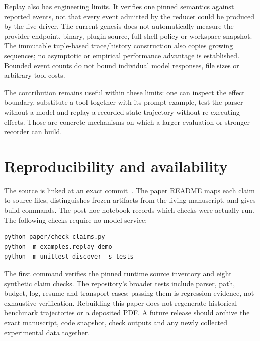 \documentclass[10pt,twocolumn,letterpaper]{article}
\begin{document}
Replay also has engineering limits. It verifies one pinned semantics against reported events, not that every event admitted by the reducer could be produced by the live driver. The current genesis does not automatically measure the provider endpoint, binary, plugin source, full shell policy or workspace snapshot. The immutable tuple-based trace/history construction also copies growing sequences; no asymptotic or empirical performance advantage is established. Bounded event counts do not bound individual model responses, file sizes or arbitrary tool costs.

The contribution remains useful within these limits: one can inspect the effect boundary, substitute a tool together with its prompt example, test the parser without a model and replay a recorded state trajectory without re-executing effects. Those are concrete mechanisms on which a larger evaluation or stronger recorder can build.

\section{Reproducibility and availability}
The source is linked at an exact commit~\cite{nakedagentsource}. The paper README maps each claim to source files, distinguishes frozen artifacts from the living manuscript, and gives build commands. The post-hoc notebook records which checks were actually run. The following checks require no model service:
\begin{lstlisting}
python paper/check_claims.py
python -m examples.replay_demo
python -m unittest discover -s tests
\end{lstlisting}
The first command verifies the pinned runtime source inventory and eight synthetic claim checks. The repository's broader tests include parser, path, budget, log, resume and transport cases; passing them is regression evidence, not exhaustive verification. Rebuilding this paper does not regenerate historical benchmark trajectories or a deposited PDF. A future release should archive the exact manuscript, code snapshot, check outputs and any newly collected experimental data together.



\end{document}
